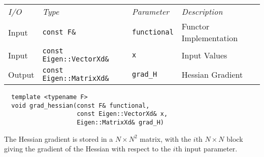 \begin{tcolorbox}[colback=white,colframe=gray90, coltitle=black,boxrule=3pt,
fonttitle=\bfseries,title=Hessian Gradient]

\begin{tabular}{llll}
\textit{I/O} & \textit{Type} & \textit{Parameter} & \textit{Description} \\
Input & \texttt{const F\&} & \texttt{functional} & Functor Implementation \\
Input & \texttt{const Eigen::VectorXd\&} & \texttt{x} & Input Values \\
Output & \texttt{const Eigen::MatrixXd\&} & \texttt{grad\_H} & Hessian Gradient \\
\end{tabular}

\vspace{5mm}

\begin{verbatim}
  template <typename F>
  void grad_hessian(const F& functional,
                    const Eigen::VectorXd& x,
                    Eigen::MatrixXd& grad_H)
\end{verbatim}

\vspace{5mm}

The Hessian gradient is stored in a $N \times N^{2}$ matrix, with the $i$th
$N \times N$ block giving the gradient of the Hessian with respect to the
$i$th input parameter.

\end{tcolorbox}

